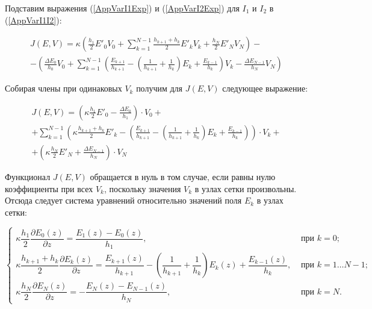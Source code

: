 Подставим выражения (\ref{AppVarI1Exp}) и (\ref{AppVarI2Exp}) для $I_1$ и $I_2$ в (\ref{AppVarI1I2}):

\begin{equation}
\begin{array}{c}
J(E, V) = \kappa \left( \frac{h_1}{2} E'_0 V_0 +
                        \sum\limits_{k=1}^{N-1} \frac{h_{k+1} + h_k}{2} E'_k V_k +
                        \frac{h_N}{2} E'_N V_N \right) - \\[1em]

      - \left( \frac{\Delta E_0}{h_0} V_0 + \sum\limits_{k=1}^{N-1} \left( \frac{E_{k+1}}{h_{k+1}} -
        \left(\frac{1}{h_{k+1}} + \frac{1}{h_k}\right)E_k + \frac{E_{k-1}}{h_k} \right) V_k - \frac{\Delta E_{N-1}}{h_N} V_N \right)
\end{array}
\end{equation}

Собирая члены при одинаковых $V_k$ получим для $J(E, V)$ следующее выражение:

\begin{equation}
\begin{array}{c}
J(E, V) = \left( \kappa \frac{h_1}{2} E'_0 - \frac{\Delta E_0}{h_1} \right) \cdot V_0 + \\[1em]

        + \sum\limits_{k=1}^{N-1} \left( \kappa \frac{h_{k+1} + h_k}{2}E'_k - \left( \frac{E_{k+1}}{h_{k+1}} -
          \left(\frac{1}{h_{k+1}} + \frac{1}{h_k}\right)E_k + \frac{E_{k-1}}{h_k} \right) \right) \cdot V_k + \\[1em]

        + \left( \kappa \frac{h_N}{2} E'_N + \frac{\Delta E_{N-1}}{h_N} \right) \cdot V_N
\end{array}
\end{equation}

Функционал $J(E, V)$ обращается в нуль в том случае, если равны нулю коэффициенты при всех $V_k$,
поскольку значения $V_k$ в узлах сетки произвольны. Отсюда следует система уравнений относительно
значений поля $E_k$ в узлах сетки:

\begin{equation}\label{AppVarFinalSystem}
\left\{
\begin{array}{ll}
	\kappa \dfrac{h_1}{2} \dfrac{\partial E_0(z)}{\partial z} = \dfrac{E_1(z) - E_0(z)}{h_1}, & \mbox{ при } k = 0; \\[1em]

	\kappa \dfrac{h_{k+1} + h_k}{2} \dfrac{\partial E_k(z)}{\partial z} = \dfrac{E_{k+1}(z)}{h_{k+1}} -
    \left(\dfrac{1}{h_{k+1}} + \dfrac{1}{h_k}\right)E_k(z) + \dfrac{E_{k-1}(z)}{h_k}, & \mbox{ при } k = 1 \ldots N-1; \\[1em]

	\kappa \dfrac{h_N}{2} \dfrac{\partial E_N(z)}{\partial z} = - \dfrac{E_N(z) - E_{N-1}(z)}{h_N}, & \mbox{ при } k = N.
\end{array}
\right.
\end{equation}

